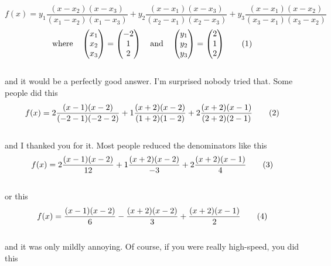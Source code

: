 \documentclass{article}
\newcommand\numberthis{\addtocounter{equation}{1}\tag{\theequation}}
\begin{document}
\[
f(x)  = y_1 \frac{(x - x_2)(x - x_3)}{(x_1 - x_2)(x_1 - x_3)} + y_2 \frac{(x - x_1)(x - x_3)}{(x_2 - x_1)(x_2 - x_3)} + y_3 \frac{(x - x_1)(x - x_2)}{(x_3 - x_1)(x_3 - x_2)} 
\]
\[
\text{where} \quad \begin{pmatrix} x_1 \\ x_2 \\ x_3 \end{pmatrix}  = \begin{pmatrix} -2 \\ 1 \\ 2 \end{pmatrix} \quad \text{and} \quad  \begin{pmatrix} y_1 \\ y_2 \\ y_3 \end{pmatrix}  = \begin{pmatrix} 2 \\ 1 \\ 2 \end{pmatrix} \numberthis
\] \\

{\setlength{\parindent}{0cm}
and it would be a perfectly good answer. I'm surprised nobody tried that. Some people did this}\\

\[
f(x)  = 2 \frac{(x - 1)(x - 2)}{(-2  - 1)(-2  - 2)} + 1 \frac{(x + 2)(x - 2)}{(1 + 2)(1 - 2)} + 2 \frac{(x + 2)(x - 1)}{(2 + 2)(2 - 1)} \numberthis \\
\] \\

{\setlength{\parindent}{0cm}
and I thanked you for it. Most people reduced the denominators like this} \\

\[
f(x)  = 2 \frac{(x - 1)(x - 2)}{12} + 1 \frac{(x + 2)(x - 2)}{-3} + 2 \frac{(x + 2)(x - 1)}{4} \numberthis \\
\] \\

{\setlength{\parindent}{0cm}
or this} \\

\[
f(x)  =  \frac{(x - 1)(x - 2)}{6} -  \frac{(x + 2)(x - 2)}{3} + \frac{(x + 2)(x - 1)}{2} \numberthis \\
\] \\

{\setlength{\parindent}{0cm}
and it was only mildly annoying. Of course, if you were really high-speed, you did this} \\
\end{document}

